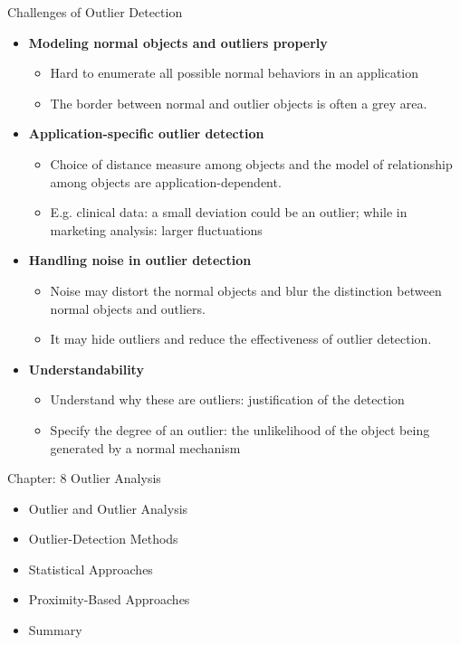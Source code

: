 \documentclass[aspectratio=169,t,xcolor=dvipsnames]{beamer}
\begin{document}
%

\begin{frame}{Challenges of Outlier Detection}
\begin{itemize}
    \item \textbf{Modeling normal objects and outliers properly}
    \begin{itemize}
        \item Hard to enumerate all possible normal behaviors in an application
        \item The border between normal and outlier objects is often a grey area.
    \end{itemize}
    \item \textbf{Application-specific outlier detection}
    \begin{itemize}
        \item Choice of distance measure among objects and the model of relationship among objects are application-dependent.
        \item E.g. clinical data: a small deviation could be an outlier; while in marketing analysis: larger fluctuations
    \end{itemize}
    \item \textbf{Handling noise in outlier detection}
    \begin{itemize}
        \item Noise may distort the normal objects and blur the distinction between normal objects and outliers.
        \item It may hide outliers and reduce the effectiveness of outlier detection.
    \end{itemize}
    \item \textbf{Understandability}
    \begin{itemize}
        \item Understand why these are outliers: justification of the detection
        \item Specify the degree of an outlier: the unlikelihood of the object being generated by a normal mechanism
    \end{itemize}
\end{itemize}    
\end{frame}

%

\begin{frame}{Chapter: 8 Outlier Analysis}
\bf
    \begin{itemize}
        \item Outlier and Outlier Analysis
        \item \alert{ Outlier-Detection Methods}
        \item Statistical Approaches
        \item Proximity-Based Approaches
        \item Summary
    \end{itemize}
\end{frame}
\end{document}

